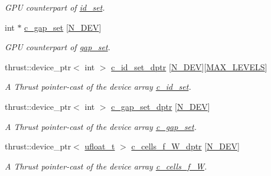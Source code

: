 \begin{DoxyCompactItemize}
\begin{DoxyCompactList}\small\item\em G\+PU counterpart of \hyperlink{classMesh_a56b8d1c6a79e59537d3ca70fb176fe30}{id\+\_\+set}. \end{DoxyCompactList}\item 
int $\ast$ \hyperlink{classMesh_a34f413b39ee5010f0bd8ddb271c25064}{c\+\_\+gap\+\_\+set} \mbox{[}\hyperlink{cppspec_8h_a2b674dab7a14f1bf32b48b7fda5022dc}{N\+\_\+\+D\+EV}\mbox{]}
\begin{DoxyCompactList}\small\item\em G\+PU counterpart of \hyperlink{classMesh_ac93e6c7bad14ea20def3e3464a261322}{gap\+\_\+set}. \end{DoxyCompactList}\item 
thrust\+::device\+\_\+ptr$<$ int $>$ \hyperlink{classMesh_af0749240e39786e28e8cfc98f67f0076}{c\+\_\+id\+\_\+set\+\_\+dptr} \mbox{[}\hyperlink{cppspec_8h_a2b674dab7a14f1bf32b48b7fda5022dc}{N\+\_\+\+D\+EV}\mbox{]}\mbox{[}\hyperlink{cppspec_8h_add784659439a8dd6b1423406171414d3}{M\+A\+X\+\_\+\+L\+E\+V\+E\+LS}\mbox{]}
\begin{DoxyCompactList}\small\item\em A Thrust pointer-\/cast of the device array \hyperlink{classMesh_ae4bc3c2c0013415db58fa77623b21ca5}{c\+\_\+id\+\_\+set}. \end{DoxyCompactList}\item 
thrust\+::device\+\_\+ptr$<$ int $>$ \hyperlink{classMesh_a61c0adf36d6b29b65d1b1ffdb2b43568}{c\+\_\+gap\+\_\+set\+\_\+dptr} \mbox{[}\hyperlink{cppspec_8h_a2b674dab7a14f1bf32b48b7fda5022dc}{N\+\_\+\+D\+EV}\mbox{]}
\begin{DoxyCompactList}\small\item\em A Thrust pointer-\/cast of the device array \hyperlink{classMesh_a34f413b39ee5010f0bd8ddb271c25064}{c\+\_\+gap\+\_\+set}. \end{DoxyCompactList}\item 
thrust\+::device\+\_\+ptr$<$ \hyperlink{cppspec_8h_af529d360dfac9b9578aa719418a53a21}{ufloat\+\_\+t} $>$ \hyperlink{classMesh_a7d1752c2544e2fcba8242e024fe440c3}{c\+\_\+cells\+\_\+f\+\_\+\+W\+\_\+dptr} \mbox{[}\hyperlink{cppspec_8h_a2b674dab7a14f1bf32b48b7fda5022dc}{N\+\_\+\+D\+EV}\mbox{]}
\begin{DoxyCompactList}\small\item\em A Thrust pointer-\/cast of the device array \hyperlink{classMesh_aa148542495502c0c42dfb462d6f41f02}{c\+\_\+cells\+\_\+f\+\_\+W}. \end{DoxyCompactList}\item 

\end{DoxyCompactItemize}
